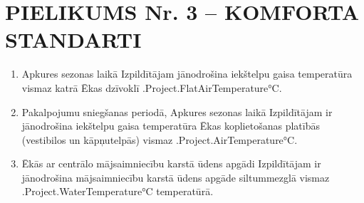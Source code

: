 \section{PIELIKUMS Nr. 3 – KOMFORTA STANDARTI}

\begin{enumerate}[label=\arabic*.]
	\item Apkures sezonas laikā Izpildītājam jānodrošina iekštelpu gaisa temperatūra vismaz katrā Ēkas dzīvoklī \iffalse input project.flat_airtemp value="{{.Project.FlatAirTemperature}}" \fi {{.Project.FlatAirTemperature}}°C.

	\item Pakalpojumu sniegšanas periodā, Apkures sezonas laikā Izpildītājam ir jānodrošina iekštelpu gaisa temperatūra Ēkas koplietošanas platībās (vestibilos un kāpņutelpās) vismaz \iffalse input project.airtemp value="{{.Project.AirTemperature}}" \fi {{.Project.AirTemperature}}°C.

	\item Ēkās ar centrālo mājsaimniecību karstā ūdens apgādi Izpildītājam ir jānodrošina mājsaimniecību karstā ūdens apgāde siltummezglā vismaz \iffalse input project.watertemp value="{{.Project.WaterTemperature}}" \fi {{.Project.WaterTemperature}}°C temperatūrā.
\end{enumerate}
